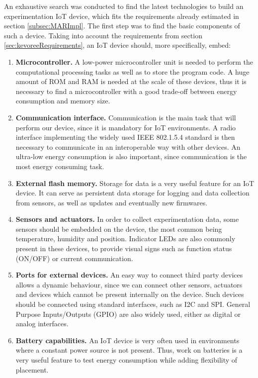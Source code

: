 An exhaustive search was conducted to find the latest technologies to build an experimentation IoT device, which fits the requirements already estimated in section \ref{subsec:MARImpl}.
The first step was to find the basic components of such a device.
Taking into account the requirements from section \ref{sec:kevoreeRequirements}, an IoT device should, more specifically, embed:
\begin{enumerate}
	\item \textbf{Microcontroller.} A low-power microcontroller unit is needed to perform the computational processing tasks as well as to store the program code. 
	A huge amount of ROM and RAM is needed at the scale of these devices, thus it is necessary to find a microcontroller with a good trade-off between energy consumption and memory size.
	\item \textbf{Communication interface.} Communication is the main task that will perform our device, since it is mandatory for IoT environments.
	A radio interface implementing the widely used IEEE 802.1.5.4 standard \cite{ieee802.15.4} is then necessary to communicate in an interoperable way with other devices.
	An ultra-low energy consumption is also important, since communication is the most energy consuming task.
	\item \textbf{External flash memory.} Storage for data is a very useful feature for an IoT device. It can serve as persistent data storage for logging and data collection from sensors, as well as updates and eventually new firmwares.
	\item \textbf{Sensors and actuators.} In order to collect experimentation data, some sensors should be embedded on the device, the most common being temperature, humidity and position.
	Indicator LEDs are also commonly present in these devices, to provide visual signs such as function status (ON/OFF) or current communication.
	\item \textbf{Ports for external devices.} An easy way to connect third party devices allows a dynamic behaviour, since we can connect other sensors, actuators and devices which cannot be present internally on the device.
	Such devices should be connected using standard interfaces, such as I2C and SPI.
	General Purpose Inputs/Outputs (GPIO) are also widely used, either as digital or analog interfaces.
	\item \textbf{Battery capabilities.} An IoT device is very often used in environments where a constant power source is not present.
	Thus, work on batteries is a very useful feature to test energy consumption while adding flexibility of placement.
\end{enumerate}

